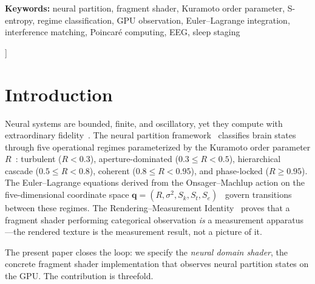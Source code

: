 \documentclass[11pt,twocolumn,a4paper]{article}
\newcommand{\Sk}{S_k}
\newcommand{\St}{S_t}
\newcommand{\Se}{S_e}
\newcommand{\qvec}{\mathbf{q}}
\begin{document}
\begin{@twocolumnfalse}
\begin{center}
\begin{minipage}{0.92\textwidth}
\vspace{8pt}
\noindent\textbf{Keywords:} neural partition, fragment shader, Kuramoto order parameter, S-entropy, regime classification, GPU observation, Euler--Lagrange integration, interference matching, Poincar\'{e} computing, EEG, sleep staging
\end{minipage}

\vspace{18pt}
\end{center}
\end{@twocolumnfalse}
]


\section{Introduction}
\label{sec:introduction}

Neural systems are bounded, finite, and oscillatory, yet they compute with extraordinary fidelity~\cite{buzsaki2006,fries2005}.
The neural partition framework~\cite{sachikonye2026regime,sachikonye2026aperture,sachikonye2026operator,sachikonye2026purpose} classifies brain states through five operational regimes parameterized by the Kuramoto order parameter $R$~\cite{kuramoto1975,strogatz2000,acebron2005}: turbulent ($R < 0.3$), aperture-dominated ($0.3 \leq R < 0.5$), hierarchical cascade ($0.5 \leq R < 0.8$), coherent ($0.8 \leq R < 0.95$), and phase-locked ($R \geq 0.95$).
The Euler--Lagrange equations derived from the Onsager--Machlup action on the five-dimensional coordinate space $\qvec = (R, \sigma^2, \Sk, \St, \Se)$~\cite{sachikonye2026lagrangian} govern transitions between these regimes.
The Rendering--Measurement Identity~\cite{sachikonye2026gpu} proves that a fragment shader performing categorical observation \emph{is} a measurement apparatus---the rendered texture is the measurement result, not a picture of it.

The present paper closes the loop: we specify the \emph{neural domain shader}, the concrete fragment shader implementation that observes neural partition states on the GPU.
The contribution is threefold.
\end{document}
